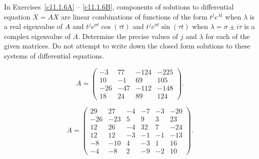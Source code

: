 \documentclass{ximera}
\begin{document}
In Exercises~\ref{c11.1.6A} -- \ref{c11.1.6B}, components of solutions to 
differential equation $\dot{X}=AX$ are linear combinations of functions of 
the form $t^je^{\lambda t}$ when $\lambda$ is a real eigenvalue of $A$ and 
$t^je^{\sigma t}\cos(\tau t)$ and $t^je^{\sigma t}\sin(\tau t)$ when
$\lambda=\sigma\pm i\tau$ is a complex eigenvalue of $A$.  Determine the
precise values of $j$ and $\lambda$ for each of the given matrices.  Do not
attempt to write down the closed form solutions to these systems of
differential equations.
\begin{exercise} \label{c11.1.6A}
\begin{equation*}
A=\left(\begin{array}{rrrr}  
   -3 &  77 & -124 & -225 \\
   10 &  -1 &   69 &  105 \\
  -26 & -47 & -112 & -148 \\
   18 &  24 &   89 &  124 \end{array} \right).
\end{equation*}
\end{exercise}
\begin{exercise} \label{c11.1.6B}
\begin{equation*}
A=\left(\begin{array}{rrrrrr}  
   29 &  27 &  -4 &  -7 &  -3 & -20 \\
  -26 & -23 &   5 &   9 &   3 &  23 \\
   12 &  26 &  -4 &  32 &   7 & -24 \\
   12 &  12 &  -3 &  -1 &  -1 & -13 \\
   -8 & -10 &   4 &  -3 &   1 &  16 \\
   -4 &  -8 &   2 &  -9 &  -2 &  10  \end{array} \right).
\end{equation*}
\end{exercise}



 
\end{document}

